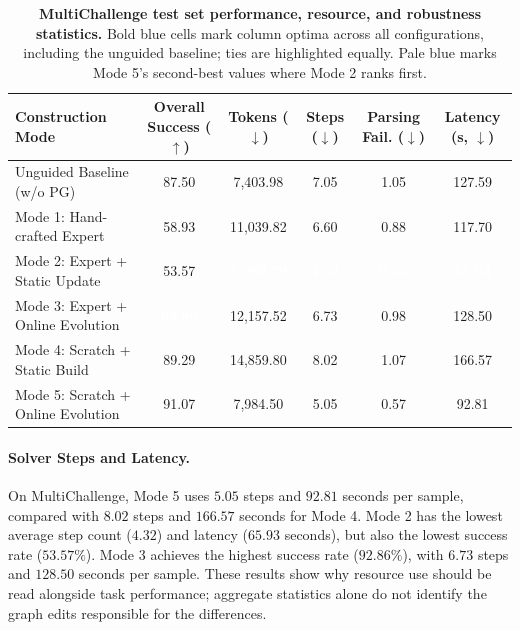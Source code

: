 \begin{table}[htbp]
\centering
\scriptsize
\setlength{\aboverulesep}{0pt}
\setlength{\belowrulesep}{0pt}
\renewcommand{\arraystretch}{1.2}
\setlength{\tabcolsep}{7.8pt}
\caption{\textbf{MultiChallenge test set performance, resource, and robustness statistics.} Bold blue cells mark column optima across all configurations, including the unguided baseline; ties are highlighted equally. Pale blue marks Mode 5's second-best values where Mode 2 ranks first.}
\label{tab:mc_efficiency}
\begin{tabular}{l c c c c c}
\toprule
\rowcolor{GoogleBlue!15}
\textbf{Construction Mode} & \textbf{Overall Success ($\uparrow$)} & \textbf{Tokens ($\downarrow$)} & \textbf{Steps ($\downarrow$)} & \textbf{Parsing Fail. ($\downarrow$)} & \textbf{Latency (s, $\downarrow$)} \\
\midrule
Unguided Baseline (w/o PG) & 87.50 & 7,403.98 & 7.05 & 1.05 & 127.59 \\
Mode 1: Hand-crafted Expert & 58.93 & 11,039.82 & 6.60 & 0.88 & 117.70 \\
Mode 2: Expert + Static Update & 53.57 & \cellcolor{GoogleBlue}\textcolor{white}{\textbf{5,990.79}} & \cellcolor{GoogleBlue}\textcolor{white}{\textbf{4.32}} & \cellcolor{GoogleBlue}\textcolor{white}{\textbf{0.36}} & \cellcolor{GoogleBlue}\textcolor{white}{\textbf{65.93}} \\
Mode 3: Expert + Online Evolution & \cellcolor{GoogleBlue}\textcolor{white}{\textbf{92.86}} & 12,157.52 & 6.73 & 0.98 & 128.50 \\
Mode 4: Scratch + Static Build & 89.29 & 14,859.80 & 8.02 & 1.07 & 166.57 \\
Mode 5: Scratch + Online Evolution & 91.07 & 7,984.50 & \cellcolor{GoogleBlue!15}5.05 & \cellcolor{GoogleBlue!15}0.57 & \cellcolor{GoogleBlue!15}92.81 \\
\bottomrule
\end{tabular}
\end{table}

\paragraph{Solver Steps and Latency.}
On MultiChallenge, Mode 5 uses $5.05$ steps and $92.81$ seconds per sample, compared with $8.02$ steps and $166.57$ seconds for Mode 4. Mode 2 has the lowest average step count ($4.32$) and latency ($65.93$ seconds), but also the lowest success rate ($53.57\%$). Mode 3 achieves the highest success rate ($92.86\%$), with $6.73$ steps and $128.50$ seconds per sample. These results show why resource use should be read alongside task performance; aggregate statistics alone do not identify the graph edits responsible for the differences.

